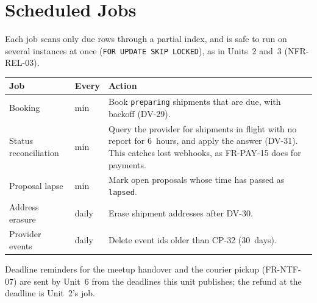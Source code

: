 \documentclass[11pt,a4paper]{article}
\newenvironment{dtable}[1]{\small\begin{longtable}{#1}}{\end{longtable}}
\begin{document}
\section{Scheduled Jobs}
\label{sec:jobs}
Each job scans only due rows through a partial index, and is safe to run on several instances at once (\texttt{FOR UPDATE SKIP LOCKED}), as in Units~2 and~3 (NFR-REL-03).
\begin{dtable}{@{}>{\raggedright\arraybackslash}p{3.6cm}>{\raggedright\arraybackslash}p{1.8cm}>{\raggedright\arraybackslash}p{9.8cm}@{}}
\toprule
\textbf{Job} & \textbf{Every} & \textbf{Action} \\ \midrule \endhead
Booking & 1 min & Book \texttt{preparing} shipments that are due, with backoff (DV-29). \\
Status reconciliation & 30 min & Query the provider for shipments in flight with no report for 6~hours, and apply the answer (DV-31). This catches lost webhooks, as FR-PAY-15 does for payments. \\
Proposal lapse & 15 min & Mark open proposals whose time has passed as \texttt{lapsed}. \\
Address erasure & daily & Erase shipment addresses after DV-30. \\
Provider events & daily & Delete event ids older than CP-32 (30~days). \\
\bottomrule
\end{dtable}
Deadline reminders for the meetup handover and the courier pickup (FR-NTF-07) are sent by Unit~6 from the deadlines this unit publishes; the refund at the deadline is Unit~2's job.
\end{document}
